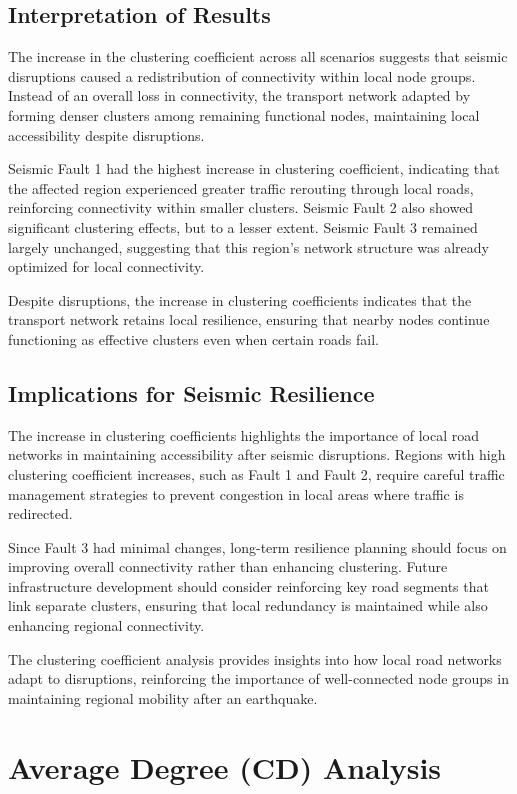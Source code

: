 \subsection{Interpretation of Results}
The increase in the clustering coefficient across all scenarios suggests that seismic disruptions caused a redistribution of connectivity within local node groups. Instead of an overall loss in connectivity, the transport network adapted by forming denser clusters among remaining functional nodes, maintaining local accessibility despite disruptions.

Seismic Fault 1 had the highest increase in clustering coefficient, indicating that the affected region experienced greater traffic rerouting through local roads, reinforcing connectivity within smaller clusters. Seismic Fault 2 also showed significant clustering effects, but to a lesser extent. Seismic Fault 3 remained largely unchanged, suggesting that this region’s network structure was already optimized for local connectivity.

Despite disruptions, the increase in clustering coefficients indicates that the transport network retains local resilience, ensuring that nearby nodes continue functioning as effective clusters even when certain roads fail.

\subsection{Implications for Seismic Resilience}
The increase in clustering coefficients highlights the importance of local road networks in maintaining accessibility after seismic disruptions. Regions with high clustering coefficient increases, such as Fault 1 and Fault 2, require careful traffic management strategies to prevent congestion in local areas where traffic is redirected.

Since Fault 3 had minimal changes, long-term resilience planning should focus on improving overall connectivity rather than enhancing clustering. Future infrastructure development should consider reinforcing key road segments that link separate clusters, ensuring that local redundancy is maintained while also enhancing regional connectivity.

The clustering coefficient analysis provides insights into how local road networks adapt to disruptions, reinforcing the importance of well-connected node groups in maintaining regional mobility after an earthquake.

\section{Average Degree (CD) Analysis}
